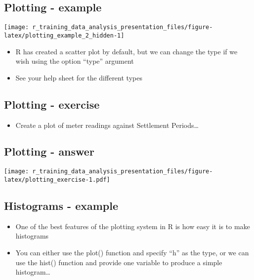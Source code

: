 \documentclass[]{article}
\newenvironment{Shaded}{\begin{snugshade}}{\end{snugshade}}
\newcommand{\KeywordTok}[1]{\textcolor[rgb]{0.13,0.29,0.53}{\textbf{#1}}}
\newcommand{\DataTypeTok}[1]{\textcolor[rgb]{0.13,0.29,0.53}{#1}}
\newcommand{\OperatorTok}[1]{\textcolor[rgb]{0.81,0.36,0.00}{\textbf{#1}}}
\newcommand{\NormalTok}[1]{#1}
\providecommand{\tightlist}{%
  \setlength{\itemsep}{0pt}\setlength{\parskip}{0pt}}
\begin{document}
\subsection{Plotting - example}\label{plotting---example-3}

\begin{center}\texttt{[image: r\_training\_data\_analysis\_presentation\_files/figure-latex/plotting\_example\_2\_hidden-1]} \end{center}

\begin{itemize}
\tightlist
\item
  R has created a scatter plot by default, but we can change the type if
  we wish using the option ``type'' argument
\item
  See your help sheet for the different types
\end{itemize}

\subsection{Plotting - exercise}\label{plotting---exercise}

\begin{itemize}
\tightlist
\item
  Create a plot of meter readings against Settlement Periods\ldots{}
\end{itemize}

\subsection{Plotting - answer}\label{plotting---answer}

\begin{Shaded}
\end{Shaded}

\texttt{[image: r\_training\_data\_analysis\_presentation\_files/figure-latex/plotting\_exercise-1.pdf]}

\subsection{Histograms - example}\label{histograms---example}

\begin{itemize}
\tightlist
\item
  One of the best features of the plotting system in R is how easy it is
  to make histograms
\item
  You can either use the plot() function and specify ``h'' as the type,
  or we can use the hist() function and provide one variable to produce
  a simple histogram\ldots{}
\end{itemize}
\end{document}
